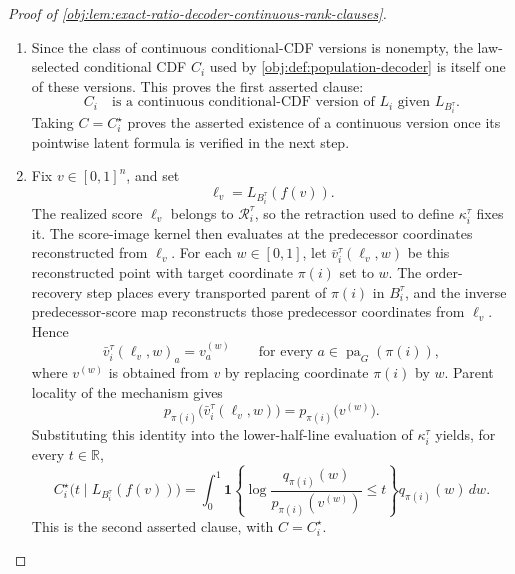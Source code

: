 \documentclass[11pt]{article}
\begin{document}
\begin{proof}[Proof of \cref{obj:lem:exact-ratio-decoder-continuous-rank-clauses}]
\begin{enumerate}
\item Since the class of continuous conditional-CDF versions is nonempty, the law-selected conditional CDF \(C_i\) used by \cref{obj:def:population-decoder} is itself one of these versions.  This proves the first asserted clause:
\[
C_i
\quad\text{is a continuous conditional-CDF version of }L_i\text{ given }L_{B_i^\tau}.
\]
Taking \(C=C_i^\star\) proves the asserted existence of a continuous version once its pointwise latent formula is verified in the next step. %

\item Fix \(v\in[0,1]^n\), and set
\[
\ell_v=L_{B_i^\tau}(f(v)).
\]
The realized score \(\ell_v\) belongs to \(\mathcal R_i^\tau\), so the retraction used to define \(\kappa_i^\tau\) fixes it.  The score-image kernel then evaluates at the predecessor coordinates reconstructed from \(\ell_v\).  For each \(w\in[0,1]\), let \(\bar v_i^\tau(\ell_v,w)\) be this reconstructed point with target coordinate \(\pi(i)\) set to \(w\).  The order-recovery step places every transported parent of \(\pi(i)\) in \(B_i^\tau\), and the inverse predecessor-score map reconstructs those predecessor coordinates from \(\ell_v\).  Hence
\[
\bar v_i^\tau(\ell_v,w)_a=v^{(w)}_a
\qquad
\text{for every }a\in\operatorname{pa}_G(\pi(i)),
\]
where \(v^{(w)}\) is obtained from \(v\) by replacing coordinate \(\pi(i)\) by \(w\).  Parent locality of the mechanism gives
\[
p_{\pi(i)}\bigl(\bar v_i^\tau(\ell_v,w)\bigr)
=
p_{\pi(i)}\bigl(v^{(w)}\bigr).
\]
Substituting this identity into the lower-half-line evaluation of \(\kappa_i^\tau\) yields, for every \(t\in\mathbb R\),
\[
C_i^\star\bigl(t\mid L_{B_i^\tau}(f(v))\bigr)
=
\int_0^1
\mathbf 1\!\left\{
\log\frac{q_{\pi(i)}(w)}
{p_{\pi(i)}(v^{(w)})}\le t
\right\}
q_{\pi(i)}(w)\,dw .
\]
This is the second asserted clause, with \(C=C_i^\star\). %


\end{enumerate}
\end{proof}
\end{document}
